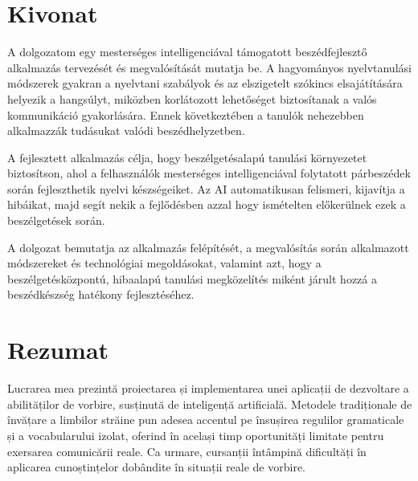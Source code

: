 
\hungarianParagraph


\chapter*{Kivonat}

A dolgozatom egy mesterséges intelligenciával támogatott beszédfejlesztő alkalmazás tervezését és megvalósítását mutatja be. A hagyományos nyelvtanulási módszerek gyakran a nyelvtani szabályok és az elszigetelt szókincs elsajátítására helyezik a hangsúlyt, miközben korlátozott lehetőséget biztosítanak a valós kommunikáció gyakorlására. Ennek következtében a tanulók nehezebben alkalmazzák tudásukat valódi beszédhelyzetben.

A fejlesztett alkalmazás célja, hogy beszélgetésalapú tanulási környezetet biztosítson, ahol a felhasználók mesterséges intelligenciával folytatott párbeszédek során fejleszthetik nyelvi készségeiket. Az AI automatikusan felismeri, kijavítja a hibáikat, majd segít nekik a fejlődésben azzal hogy ismételten előkerülnek ezek a beszélgetések során.

A dolgozat bemutatja az alkalmazás felépítését, a megvalósítás során alkalmazott módszereket és technológiai megoldásokat, valamint azt, hogy a beszélgetésközpontú, hibaalapú tanulási megközelítés miként járult hozzá a beszédkészség hatékony fejlesztéséhez.

\vfill
{}

\chapter*{Rezumat}

Lucrarea mea prezintă proiectarea și implementarea unei aplicații de dezvoltare a abilităților de vorbire, susținută de inteligență artificială. Metodele tradiționale de învățare a limbilor străine pun adesea accentul pe însușirea regulilor gramaticale și a vocabularului izolat, oferind în același timp oportunități limitate pentru exersarea comunicării reale. Ca urmare, cursanții întâmpină dificultăți în aplicarea cunoștințelor dobândite în situații reale de vorbire.

